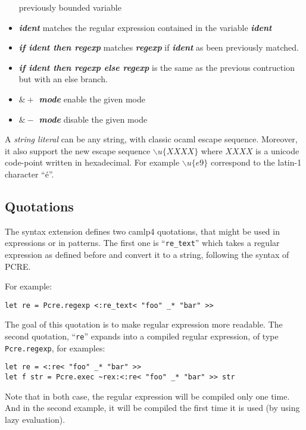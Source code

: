 \documentclass{article}
\begin{document}
\begin{itemize}
  previously bounded variable
\item \textbf{\emph{ident}} matches the regular expression contained
  in the variable \textbf{\emph{ident}}
\item \textbf{\emph{if ident then regexp}} matches
  \textbf{\emph{regexp}} if \textbf{\emph{ident}} as been previously
  matched.
\item \textbf{\emph{if ident then regexp else regexp}} is the same as
  the previous contruction but with an else branch.
\item \textbf{\emph{$\&+$ mode}} enable the given mode
\item \textbf{\emph{$\&-$ mode}} disable the given mode
\end{itemize}

A \emph{string literal} can be any string, with classic ocaml escape
sequence. Moreover, it also support the new escape sequence
$\backslash u\{XXXX\}$ where $XXXX$ is a unicode code-point written in
hexadecimal. For example $\backslash u\{e9\}$ correspond to the
latin-1 character ``é''.

\subsection{Quotations}

The syntax extension defines two camlp4 quotations, that might be used
in expressions or in patterns. The first one is ``\texttt{re\_text}'' which
takes a regular expression as defined before and convert it to a
string, following the syntax of PCRE.

For example:

\begin{verbatim}
let re = Pcre.regexp <:re_text< "foo" _* "bar" >>
\end{verbatim}

The goal of this quotation is to make regular expression more
readable. The second quotation, ``\texttt{re}'' expands into a
compiled regular expression, of type \texttt{Pcre.regexp}, for examples:

\begin{verbatim}
let re = <:re< "foo" _* "bar" >>
let f str = Pcre.exec ~rex:<:re< "foo" _* "bar" >> str
\end{verbatim}

Note that in both case, the regular expression will be compiled only
one time. And in the second example, it will be compiled the first
time it is used (by using lazy evaluation).
\end{document}

